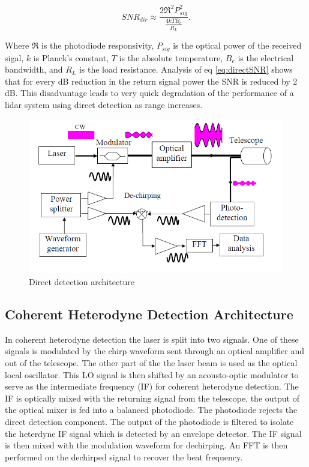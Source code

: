 \begin{equation}
\label{eq:directSNR}
SNR_{dir}\approx\frac{2\Re^2P_{sig}^2}{\frac{4kTB_e}{R_L}}. 
\end{equation}
  
Where $\Re$ is the photodiode responsivity, $P_{sig}$ is the optical power of the received sigal, $k$ is Planck's
constant, $T$ is the absolute temperature, $B_e$ is the electrical bandwidth, and $R_L$ is the load resistance.
Analysis of eq \ref{eq:directSNR} shows that for every dB reduction in the return signal power the SNR is reduced
by 2 dB. This disadvantage leads to very quick degradation of the performance of a lidar system using direct detection
as range increases. 

\begin{figure}[H]
	\centering
	\includegraphics[width=0.8\columnwidth]{figs/direct}
	\vspace{1em}
	\caption{Direct detection architecture}
	\label{fig:directBlock}
\end{figure}

\subsection{Coherent Heterodyne Detection Architecture}
In coherent heterodyne detection the laser is split into two signals. One of these signals is modulated by the 
chirp waveform sent through an optical amplifier and out of the telescope. The other part of the the laser beam 
is used as the optical local oscillator. This LO signal is then shifted by an acousto-optic modulator to serve as
the intermediate frequency (IF) for coherent heterodyne detection. The IF is optically mixed with the returning 
signal from the telescope, the output of the optical mixer is fed into a balanced photodiode. The photodiode 
rejects the direct detection component. The output of the photodiode is filtered to isolate the heterdyne IF 
signal which is detected by an envelope detector. The IF signal is then mixed with the modulation waveform 
for dechirping. An FFT is then performed on the dechirped signal to recover the beat frequency.  

